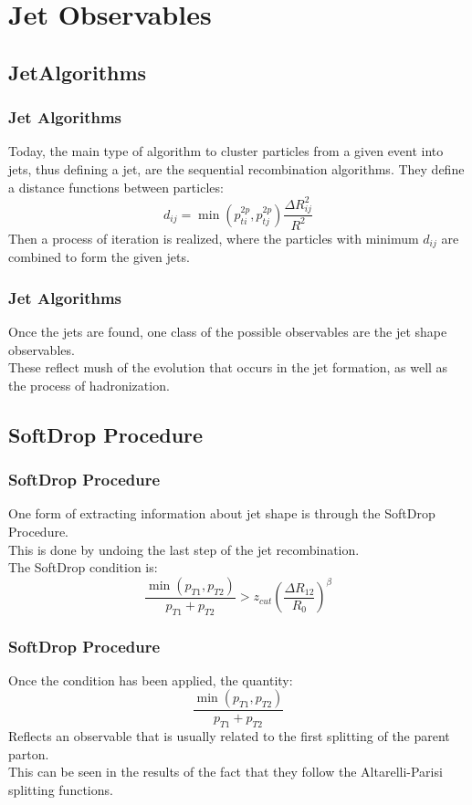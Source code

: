 \documentclass{beamer}
\begin{document}
\section{Jet Observables}
\subsection{JetAlgorithms}

\begin{frame}\frametitle{Jet Algorithms}
	Today, the main type of algorithm to cluster particles from a given event into jets,
	thus defining a jet, are the sequential recombination algorithms. They define a distance
	functions between particles:
	\pause
	\begin{equation}
	d_{ij} = \min(p_{ti}^{2p},p_{tj}^{2p}) \frac{\Delta R_{ij}^2}{R^2}
	\end{equation}
	\pause
	Then a process of iteration is realized, where the particles with minimum $d_{ij}$ are
	combined to form the given jets.
\end{frame}

\begin{frame}\frametitle{Jet Algorithms}
	Once the jets are found, one class of the possible observables are the jet shape observables.
	\pause
	\\
	These reflect mush of the evolution that occurs in the jet formation, as well as
	the process of hadronization.
\end{frame}

\subsection{SoftDrop Procedure}

\begin{frame}\frametitle{SoftDrop Procedure}
	One form of extracting information about jet shape is through the SoftDrop Procedure.
	\pause
	\\
	This is done by undoing the last step of the jet recombination.
	\pause
	\\
	The SoftDrop condition is:
	\begin{equation}
	\frac{\min(p_{T1},p_{T2})}{p_{T1}+p_{T2}} > z_{cut} \left(\frac{\Delta R_{12}}{R_0}\right)^{\beta}
	\end{equation}
\end{frame}

\begin{frame}\frametitle{SoftDrop Procedure}
	Once the condition has been applied, the quantity:
	\begin{equation}
	\frac{\min(p_{T1},p_{T2})}{p_{T1}+p_{T2}}
	\end{equation}
	Reflects an observable that is usually related to the first splitting of the parent parton.
	\pause
	\\
	This can be seen in the results of the fact that they follow the Altarelli-Parisi splitting
	functions.
\end{frame}
\end{document}
